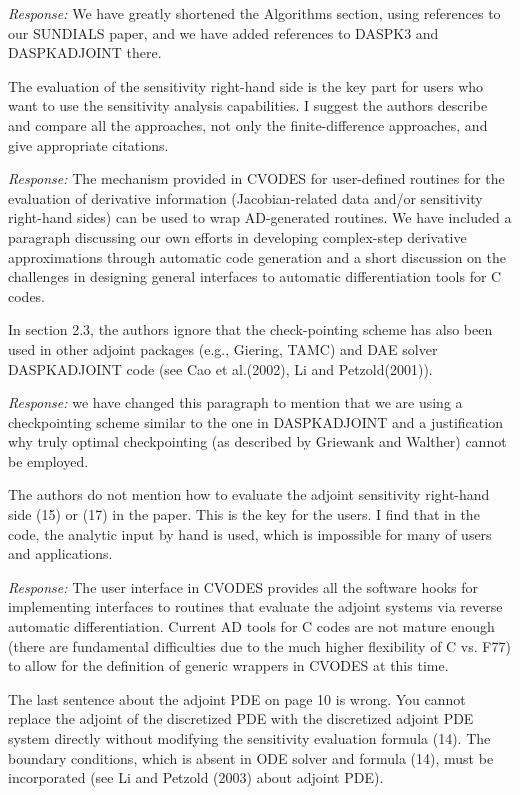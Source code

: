 {\em Response:}
We have greatly shortened the Algorithms section, using references to
our SUNDIALS paper, and we have added references to DASPK3 and
DASPKADJOINT there.

The evaluation of the sensitivity right-hand side is the key
part for users who want to use the sensitivity analysis
capabilities. I suggest the authors describe and compare all the
approaches, not only the finite-difference approaches, and give
appropriate citations. 

{\em Response:}
The mechanism provided in CVODES for user-defined routines
for the evaluation of derivative information (Jacobian-related data
and/or sensitivity right-hand sides) can be used to wrap AD-generated
routines.
We have included a paragraph discussing our own efforts 
in developing complex-step derivative approximations through automatic 
code generation and a short discussion on the challenges in 
designing general interfaces to automatic differentiation tools
for C codes.

In section 2.3, the authors ignore that the check-pointing
scheme has also been used in other adjoint packages (e.g.,
Giering, TAMC) and DAE solver DASPKADJOINT code (see Cao et
al.(2002), Li and Petzold(2001)). 

{\em Response:} 
we have changed this paragraph to mention that we are 
using a checkpointing scheme similar to the one in DASPKADJOINT
and a justification why truly optimal checkpointing (as described
by Griewank and Walther) cannot be employed.

The authors do not mention how to evaluate the adjoint sensitivity
right-hand side (15) or (17) in the paper. This is the key for the
users.  I find that in the code, the analytic input by hand is used,
which is impossible for many of users and applications.

{\em Response:}
The user interface in CVODES provides all the software hooks for 
implementing interfaces to routines that evaluate the adjoint systems via
reverse automatic differentiation. 
Current AD tools for C codes are not mature enough (there are fundamental 
difficulties due to the much higher flexibility of C vs. F77) to allow for 
the definition of generic wrappers in CVODES at this time.

The last sentence about the adjoint PDE on page 10 is wrong. 
You cannot replace the adjoint of the discretized PDE with the 
discretized adjoint PDE system directly without modifying the 
sensitivity evaluation formula (14). The boundary conditions, 
which is absent in ODE solver and formula (14), must be incorporated 
(see Li and Petzold (2003) about adjoint PDE). 

